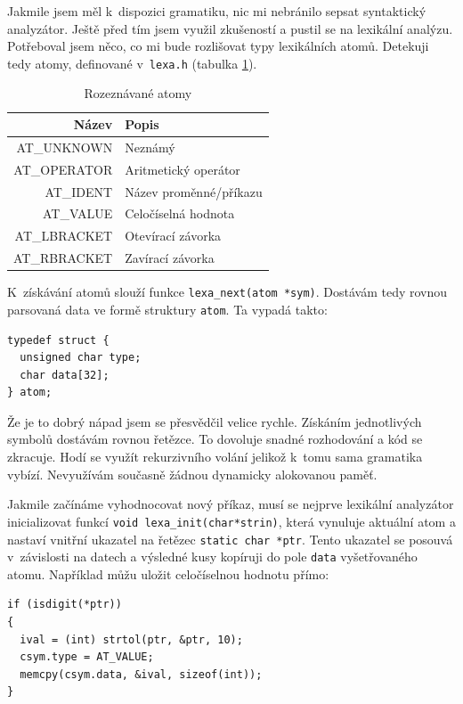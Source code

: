 \documentclass[a4paper, 12pt]{article}
\begin{document}
Jakmile jsem měl k~dispozici gramatiku, nic mi nebránilo sepsat
syntaktický analyzátor. Ještě před tím jsem využil zkušeností a pustil
se na lexikální analýzu.  Potřeboval jsem něco, co mi bude rozlišovat
typy lexikálních atomů. Detekuji tedy atomy, definované
v~\texttt{lexa.h} (tabulka \ref{tab:atom}).

\begin{table}
\centering
\begin{tabular}{|r|l|}
\hline
Název & Popis\\ \hline\hline
AT\_UNKNOWN & Neznámý\\ \hline
AT\_OPERATOR & Aritmetický operátor\\ \hline
AT\_IDENT & Název proměnné/příkazu\\ \hline
AT\_VALUE & Celočíselná hodnota\\ \hline
AT\_LBRACKET & Otevírací závorka\\ \hline
AT\_RBRACKET & Zavírací závorka\\
\hline
\end{tabular}
\caption{Rozeznávané atomy}
\label{tab:atom}
\end{table}

K~získávání atomů slouží funkce \verb+lexa_next(atom *sym)+.  Dostávám
tedy rovnou parsovaná data ve formě struktury \texttt{atom}.  Ta
vypadá takto:
\begin{lstlisting}
typedef struct {
  unsigned char type;
  char data[32];
} atom;
\end{lstlisting}

Že je to dobrý nápad jsem se přesvědčil velice rychle. Získáním
jednotlivých symbolů dostávám rovnou řetězce. To dovoluje snadné
rozhodování a kód se zkracuje. Hodí se využít rekurzivního
volání jelikož k~tomu sama gramatika vybízí.
Nevyužívám současně žádnou dynamicky alokovanou paměť.

Jakmile začínáme vyhodnocovat nový příkaz, musí se nejprve lexikální
analyzátor inicializovat funkcí
\verb+void lexa_init(char*strin)+, která vynuluje aktuální atom a
nastaví vnitřní ukazatel na řetězec \texttt{static char *ptr}. Tento
ukazatel se posouvá v~závislosti na datech a výsledné kusy kopíruji do pole
\texttt{data} vyšetřovaného atomu. Například můžu uložit celočíselnou
hodnotu přímo:

\begin{lstlisting}
if (isdigit(*ptr))
{
  ival = (int) strtol(ptr, &ptr, 10);
  csym.type = AT_VALUE;
  memcpy(csym.data, &ival, sizeof(int));
}
\end{lstlisting}
\end{document}
